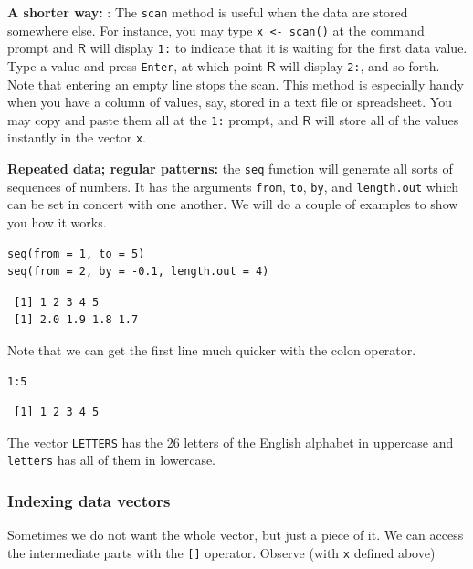 \documentclass[captions=tableheading]{scrbook}
\begin{document}
\textbf{A shorter way:} : The \texttt{scan} method is useful when the data are stored somewhere else. For instance, you may type \texttt{x <- scan()} at the command prompt and \(\mathsf{R}\) will display \texttt{1:} to indicate that it is waiting for the first data value. Type a value and press \texttt{Enter}, at which point \(\mathsf{R}\) will display \texttt{2:}, and so forth. Note that entering an empty line stops the scan. This method is especially handy when you have a column of values, say, stored in a text file or spreadsheet. You may copy and paste them all at the \texttt{1:} prompt, and \(\mathsf{R}\) will store all of the values instantly in the vector \texttt{x}. 

\textbf{Repeated data; regular patterns:} the \texttt{seq} function will generate all sorts of sequences of numbers. It has the arguments \texttt{from}, \texttt{to}, \texttt{by}, and \texttt{length.out} which can be set in concert with one another. We will do a couple of examples to show you how it works.


\lstset{language=R}
\begin{lstlisting}
seq(from = 1, to = 5)
seq(from = 2, by = -0.1, length.out = 4)
\end{lstlisting}

\begin{verbatim}
 [1] 1 2 3 4 5
 [1] 2.0 1.9 1.8 1.7
\end{verbatim}

Note that we can get the first line much quicker with the colon operator.


\lstset{language=R}
\begin{lstlisting}
1:5
\end{lstlisting}

\begin{verbatim}
 [1] 1 2 3 4 5
\end{verbatim}

The vector \texttt{LETTERS} has the 26 letters of the English alphabet in uppercase and \texttt{letters} has all of them in lowercase.
\subsubsection{Indexing data vectors}
\label{sec-2-3-3-2}


Sometimes we do not want the whole vector, but just a piece of it. We can access the intermediate parts with the \texttt{[]} operator. Observe (with \texttt{x} defined above)
\end{document}
